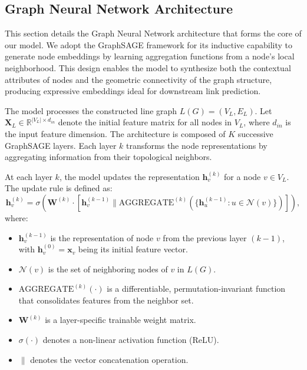 \documentclass[pdflatex,sn-mathphys-num]{sn-jnl}%
\theoremstyle{thmstyleone}%
\theoremstyle{thmstyletwo}%
\theoremstyle{thmstylethree}%
\theoremstyle{plain} %
\theoremstyle{definition} %
\theoremstyle{remark} %
\theoremstyle{plain} %
\begin{document}
\subsection{Graph Neural Network Architecture}
\label{sec:gnn_architecture}

This section details the Graph Neural Network architecture that forms the core of our model. 
We adopt the GraphSAGE framework \cite{hamilton2017inductive} for its inductive capability to generate node embeddings by learning aggregation functions from a node's local neighborhood. 
This design enables the model to synthesize both the contextual attributes of nodes and the geometric connectivity of the graph structure, producing expressive embeddings ideal for downstream link prediction.

The model processes the constructed line graph $L(G) = (V_L, E_L)$. 
Let $\mathbf{X}_L \in \mathbb{R}^{|V_L| \times d_{in}}$ denote the initial feature matrix for all nodes in $V_L$, where $d_{in}$ is the input feature dimension. 
The architecture is composed of $K$ successive GraphSAGE layers. 
Each layer $k$ transforms the node representations by aggregating information from their topological neighbors.


At each layer $k$, the model updates the representation $\mathbf{h}_v^{(k)}$ for a node $v \in V_L$. The update rule is defined as:
\begin{equation}
    \mathbf{h}_v^{(k)} = \sigma \left( \mathbf{W}^{(k)} \cdot \left[ \mathbf{h}_v^{(k-1)} \parallel \text{AGGREGATE}^{(k)} \left( \{ \mathbf{h}_u^{(k-1)} : u \in \mathcal{N}(v) \} \right) \right] \right),
\end{equation}
where:
\begin{itemize}
    \item $\mathbf{h}_v^{(k-1)}$ is the representation of node $v$ from the previous layer $(k-1)$, with $\mathbf{h}_v^{(0)} = \mathbf{x}_v$ being its initial feature vector.
    \item $\mathcal{N}(v)$ is the set of neighboring nodes of $v$ in $L(G)$.
    \item $\text{AGGREGATE}^{(k)}(\cdot)$ is a differentiable, permutation-invariant function that consolidates features from the neighbor set.
    \item $\mathbf{W}^{(k)}$ is a layer-specific trainable weight matrix.
    \item $\sigma(\cdot)$ denotes a non-linear activation function (ReLU).
    \item $\parallel$ denotes the vector concatenation operation.
\end{itemize}
\end{document}
